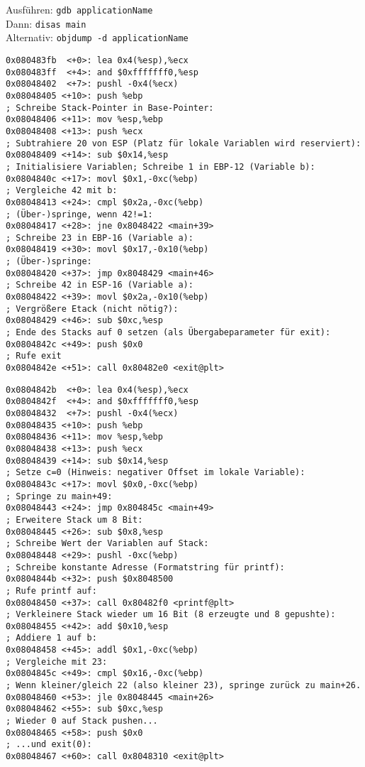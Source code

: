 Ausführen: \lstinline`gdb applicationName`\\
Dann: \lstinline`disas main`\\
Alternativ: \lstinline`objdump -d applicationName`
\begin{lstlisting}[language={[x86masm]Assembler}]
0x080483fb 	<+0>: lea 0x4(%esp),%ecx
0x080483ff 	<+4>: and $0xfffffff0,%esp
0x08048402 	<+7>: pushl -0x4(%ecx)
0x08048405 <+10>: push %ebp
; Schreibe Stack-Pointer in Base-Pointer:
0x08048406 <+11>: mov %esp,%ebp
0x08048408 <+13>: push %ecx
; Subtrahiere 20 von ESP (Platz für lokale Variablen wird reserviert):
0x08048409 <+14>: sub $0x14,%esp
; Initialisiere Variablen; Schreibe 1 in EBP-12 (Variable b):
0x0804840c <+17>: movl $0x1,-0xc(%ebp)
; Vergleiche 42 mit b:
0x08048413 <+24>: cmpl $0x2a,-0xc(%ebp)
; (Über-)springe, wenn 42!=1:
0x08048417 <+28>: jne 0x8048422 <main+39>
; Schreibe 23 in EBP-16 (Variable a):
0x08048419 <+30>: movl $0x17,-0x10(%ebp)
; (Über-)springe:
0x08048420 <+37>: jmp 0x8048429 <main+46>
; Schreibe 42 in ESP-16 (Variable a):
0x08048422 <+39>: movl $0x2a,-0x10(%ebp)
; Vergrößere Etack (nicht nötig?):
0x08048429 <+46>: sub $0xc,%esp
; Ende des Stacks auf 0 setzen (als Übergabeparameter für exit):
0x0804842c <+49>: push $0x0
; Rufe exit
0x0804842e <+51>: call 0x80482e0 <exit@plt>
\end{lstlisting}

\begin{lstlisting}[language={[x86masm]Assembler}]
0x0804842b 	<+0>: lea 0x4(%esp),%ecx
0x0804842f 	<+4>: and $0xfffffff0,%esp
0x08048432 	<+7>: pushl -0x4(%ecx)
0x08048435 <+10>: push %ebp
0x08048436 <+11>: mov %esp,%ebp
0x08048438 <+13>: push %ecx
0x08048439 <+14>: sub $0x14,%esp
; Setze c=0 (Hinweis: negativer Offset im lokale Variable):
0x0804843c <+17>: movl $0x0,-0xc(%ebp)
; Springe zu main+49:
0x08048443 <+24>: jmp 0x804845c <main+49>
; Erweitere Stack um 8 Bit:
0x08048445 <+26>: sub $0x8,%esp
; Schreibe Wert der Variablen auf Stack:
0x08048448 <+29>: pushl -0xc(%ebp)
; Schreibe konstante Adresse (Formatstring für printf):
0x0804844b <+32>: push $0x8048500
; Rufe printf auf:
0x08048450 <+37>: call 0x80482f0 <printf@plt>
; Verkleinere Stack wieder um 16 Bit (8 erzeugte und 8 gepushte):
0x08048455 <+42>: add $0x10,%esp
; Addiere 1 auf b:
0x08048458 <+45>: addl $0x1,-0xc(%ebp)
; Vergleiche mit 23: 
0x0804845c <+49>: cmpl $0x16,-0xc(%ebp)
; Wenn kleiner/gleich 22 (also kleiner 23), springe zurück zu main+26.
0x08048460 <+53>: jle 0x8048445 <main+26>
0x08048462 <+55>: sub $0xc,%esp
; Wieder 0 auf Stack pushen...
0x08048465 <+58>: push $0x0
; ...und exit(0):
0x08048467 <+60>: call 0x8048310 <exit@plt>
\end{lstlisting}

